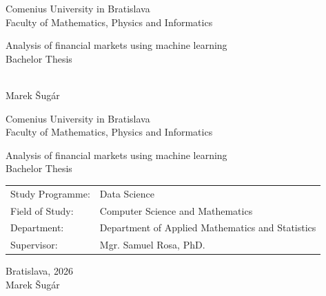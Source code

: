 \documentclass[12pt, oneside]{book}  %
\def\mfrok{2026}
\def\mfnazov{Analysis of financial markets using machine learning}
\def\mftyp{Bachelor Thesis}
\def\mfautor{Marek Šugár}
\def\mfskolitel{Mgr. Samuel Rosa, PhD. }
\def\mfmiesto{Bratislava, \mfrok}
\def\mfodbor{ Computer Science and Mathematics }
\def\program{ Data Science }
\def\mfpracovisko{ Department of Applied Mathematics and Statistics  }
\begin{document}
   

\frontmatter
\pagestyle{empty}


\begin{center}
  \sc\large
  Comenius University in Bratislava\\
  Faculty of Mathematics, Physics and Informatics

\vfill

{\LARGE\mfnazov}\\
\mftyp
\end{center}

\vfill

{\sc\large 
\noindent \mfrok\\
\mfautor
}

\cleardoublepage


\noindent

\begin{center}
\sc  
\large
  Comenius University in Bratislava\\
  Faculty of Mathematics, Physics and Informatics

\vfill

{\LARGE\mfnazov}\\
\mftyp
\end{center}

\vfill

\noindent
\begin{tabular}{ll}
Study Programme: & \program \\
Field of Study: & \mfodbor \\
Department: & \mfpracovisko \\
Supervisor: & \mfskolitel \\
\end{tabular}

\vfill


\noindent \mfmiesto\\
\mfautor

\cleardoublepage



\newpage
\setcounter{page}{3}
\end{document}
